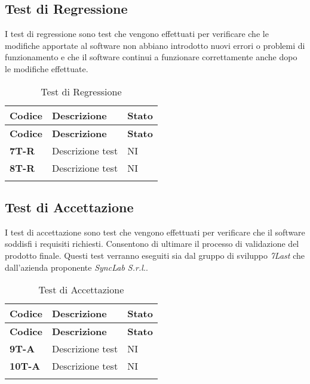 \subsection{Test di Regressione}
I test di regressione sono test che vengono effettuati per verificare che le modifiche apportate al software non abbiano introdotto nuovi errori o problemi di funzionamento e che il software continui a funzionare correttamente anche dopo le modifiche effettuate. \\
\begin{longtable}{|>{\raggedright\arraybackslash}m{}|>{\raggedright\arraybackslash}m{}|>{\raggedright\arraybackslash}m{}|}
	\hline
	\textbf{Codice} & \textbf{Descrizione} & \textbf{Stato} \\
	\hline
	\endfirsthead
	\hline
	\textbf{Codice} & \textbf{Descrizione} & \textbf{Stato} \\
	\endhead
	\textbf{7T-R}   & Descrizione test     & NI             \\
	\hline
	\textbf{8T-R}   & Descrizione test     & NI             \\
	\hline
	\caption{Test di Regressione} %
	\label{table:15}
\end{longtable}

\subsection{Test di Accettazione}
I test di accettazione sono test che vengono effettuati per verificare che il software soddisfi i requisiti richiesti. Consentono di ultimare il processo di validazione del prodotto finale. Questi test verranno eseguiti sia dal gruppo di sviluppo \textit{7Last} che dall'azienda proponente \textit{SyncLab S.r.l.}. \\
\begin{longtable}{|>{\raggedright\arraybackslash}m{}|>{\raggedright\arraybackslash}m{}|>{\raggedright\arraybackslash}m{}|}
	\hline
	\textbf{Codice} & \textbf{Descrizione} & \textbf{Stato} \\
	\hline
	\endfirsthead
	\hline
	\textbf{Codice} & \textbf{Descrizione} & \textbf{Stato} \\
	\endhead
	\textbf{9T-A}   & Descrizione test     & NI             \\
	\hline
	\textbf{10T-A}   & Descrizione test     & NI             \\
	\hline
	\caption{Test di Accettazione} %
	\label{table:16}
\end{longtable}
